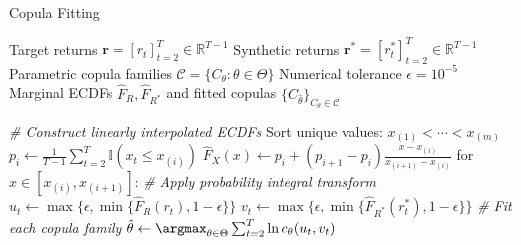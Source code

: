 \begin{algorithm}[H]
\caption{Copula Fitting}
\label{alg:copula_fit}
\begin{algorithmic}[1]
\Require
    \State Target returns $\mathbf{r} = [r_t]_{t=2}^T \in \mathbb{R}^{T-1}$
    \State Synthetic returns $\mathbf{r}^* = [r_t^*]_{t=2}^T \in \mathbb{R}^{T-1}$
    \State Parametric copula families $\mathcal{C} = \{C_\theta : \theta \in \Theta\}$
    \State Numerical tolerance $\epsilon = 10^{-5}$
\mx     
\Ensure Marginal ECDFs $\hat{F}_R, \hat{F}_{R^*}$ and fitted copulas $\{C_{\hat \theta}\}_{C_{\theta}\in \mathcal{C}}$

\mx 
{}
    \State \textit{\# Construct linearly interpolated ECDFs}
        \State Sort unique values: $x_{(1)} < \cdots < x_{(m)}$
        \State $p_i \gets \frac{1}{T-1}\sum_{t=2}^T \mathbb{I}(x_t \leq x_{(i)})$
       	\Comment{\scalebox{0.9}{\textcolor{Grey_color}{Compute empirical probabilities}}}
        \State $\hat{F}_X(x) \gets p_i + (p_{i+1} - p_i)\frac{x - x_{(i)}}{x_{(i+1)} - x_{(i)}}$ for $x \in [x_{(i)}, x_{(i+1)}]$:
        \Comment{\scalebox{0.9}{\textcolor{Grey_color}{Piecewise linear interpolation}}}
    \EndFor
    \mx 
    \State \textit{\# Apply probability integral transform}
     \State
     $u_t \gets  \max\{\epsilon, \min\{\hat{F}_R(r_t), 1-\epsilon\}\}$
	 \Comment{\scalebox{0.9}{\textcolor{Grey_color}{Adjust ECDF outputs to tolerance level $\eps$}}}
     \State
     $v_t \gets \max\{\epsilon, \min\{\hat{F}_{R^*}(r^*_t), 1-\epsilon\}\}$
    \EndFor
    \mx 
    \State \textit{\# Fit each copula family} %
        \State $\hat{\theta} \gets \argmax_{\theta \in \Theta} \sum_{t=2}^T \ln c_\theta(u_t, v_t)$

\end{algorithmic}
\end{algorithm}
